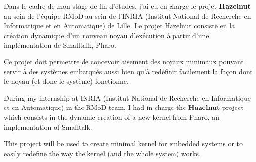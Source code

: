 \vfill 


Dans le cadre de mon stage de fin d'\'{e}tudes, j'ai eu en charge le projet \textbf{Hazelnut} au sein de l'\'{e}quipe RMoD au sein de l'INRIA (Institut National de Recherche en Informatique et en Automatique) de Lille. Le projet Hazelnut consiste en la cr\'{e}ation dynamique d'un nouveau noyau d'ex\'{e}cution \`{a} partir d'une \mbox{impl\'{e}mentation} de Smalltalk, Pharo. 

Ce projet doit permettre de concevoir aisement des noyaux minimaux pouvant servir \`{a} des syst\`{e}mes embarqu\'{e}s aussi bien qu'\`{a} red\'{e}finir facilement la fa\c{c}on dont le noyau (et donc le syst\`{e}me) fonctionne.


\vfill


During my internship at INRIA (Institut National de Recherche en Informatique et en Automatique) in the RMoD team, I had in charge the \textbf{Hazelnut} project which consists in the dynamic creation of a new kernel from Pharo, an implementation of Smalltalk.

This project will be used to create minimal kernel for embedded systems or to easily redefine the way the kernel (and the whole system) works.

\vfill

\newpage